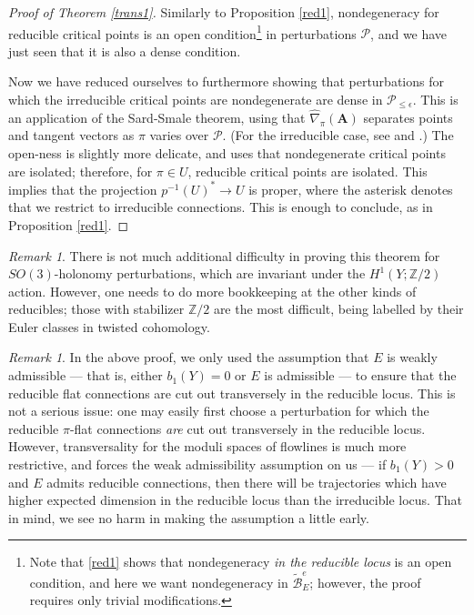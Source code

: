 \documentclass[10pt,a4paper]{amsart}
\theoremstyle{definition}
\theoremstyle{remark}
\newtheorem{remark}[theorem]{Remark}
\numberwithin{figure}{qchap}
\begin{document}
\begin{proof}[Proof of Theorem \ref{trans1}]
Similarly to Proposition \ref{red1}, nondegeneracy for reducible critical points is an open condition\footnote{Note that \ref{red1} shows that nondegeneracy \textit{in the reducible locus} is an open condition, and here we want nondegeneracy in $\widetilde{\mathcal B}^e_E$; however, the proof requires only trivial modifications.} in perturbations $\mathcal P$, and we have just seen that it is also a dense condition. 

Now we have reduced ourselves to furthermore showing that perturbations for which the irreducible critical points are nondegenerate are dense in $\mathcal P_{\leq \epsilon}$. This is an application of the Sard-Smale theorem, using that $\widehat{\nabla}_\pi(\mathbf{A})$ separates points and tangent vectors as $\pi$ varies over $\mathcal P$. (For the irreducible case, see \cite{Fl1} and \cite[Section~5.5.1]{Don}.) The open-ness is slightly more delicate, and uses that nondegenerate critical points are isolated; therefore, for $\pi \in U$, reducible critical points are isolated. This implies that the projection $p^{-1}(U)^* \to U$ is proper, where the asterisk denotes that we restrict to irreducible connections. This is enough to conclude, as in Proposition \ref{red1}.
\end{proof}

\begin{remark}There is not much additional difficulty in proving this theorem for $SO(3)$-holonomy perturbations, which are invariant under the $H^1(Y;\mathbb Z/2)$ action. However, one needs to do more bookkeeping at the other kinds of reducibles; those with stabilizer $\mathbb Z/2$ are the most difficult, being labelled by their Euler classes in twisted cohomology. 
\end{remark}

\begin{remark}In the above proof, we only used the assumption that $E$ is weakly admissible --- that is, either $b_1(Y) = 0$ or $E$ is admissible --- to ensure that the reducible flat connections are cut out transversely in the reducible locus. This is not a serious issue: one may easily first choose a perturbation for which the reducible $\pi$-flat connections \textit{are} cut out transversely in the reducible locus. However, transversality for the moduli spaces of flowlines is much more restrictive, and forces the weak admissibility assumption on us --- if $b_1(Y) > 0$ and $E$ admits reducible connections, then there will be trajectories which have higher expected dimension in the reducible locus than the irreducible locus. That in mind, we see no harm in making the assumption a little early.
\end{remark}
\end{document}
